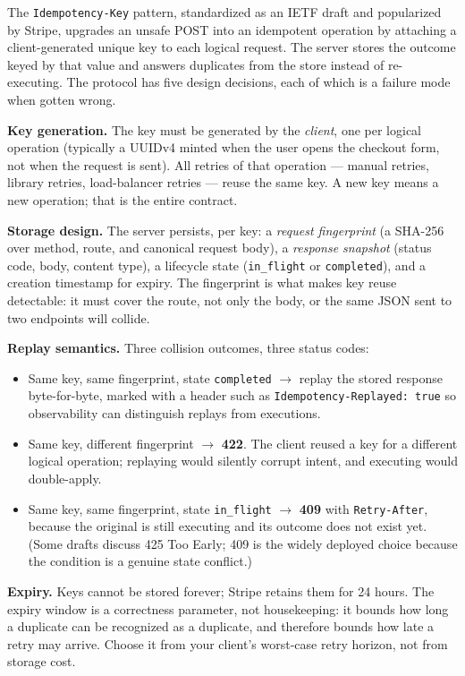 The \texttt{Idempotency-Key} pattern, standardized as an IETF draft and
popularized by Stripe, upgrades an unsafe POST into an idempotent operation
by attaching a client-generated unique key to each logical request. The
server stores the outcome keyed by that value and answers duplicates from
the store instead of re-executing. The protocol has five design decisions,
each of which is a failure mode when gotten wrong.

\textbf{Key generation.} The key must be generated by the \emph{client}, one
per logical operation (typically a UUIDv4 minted when the user opens the
checkout form, not when the request is sent). All retries of that operation
--- manual retries, library retries, load-balancer retries --- reuse the
same key. A new key means a new operation; that is the entire contract.

\textbf{Storage design.} The server persists, per key: a \emph{request
fingerprint} (a SHA-256 over method, route, and canonical request body), a
\emph{response snapshot} (status code, body, content type), a lifecycle
state (\texttt{in\_flight} or \texttt{completed}), and a creation timestamp
for expiry. The fingerprint is what makes key reuse detectable: it must
cover the route, not only the body, or the same JSON sent to two endpoints
will collide.

\textbf{Replay semantics.} Three collision outcomes, three status codes:
\begin{itemize}
  \item Same key, same fingerprint, state \texttt{completed} $\rightarrow$
        replay the stored response byte-for-byte, marked with a header such
        as \texttt{Idempotency-Replayed: true} so observability can
        distinguish replays from executions.
  \item Same key, different fingerprint $\rightarrow$ \textbf{422}. The
        client reused a key for a different logical operation; replaying
        would silently corrupt intent, and executing would double-apply.
  \item Same key, same fingerprint, state \texttt{in\_flight}
        $\rightarrow$ \textbf{409} with \texttt{Retry-After}, because the
        original is still executing and its outcome does not exist yet.
        (Some drafts discuss 425 Too Early; 409 is the widely deployed
        choice because the condition is a genuine state conflict.)
\end{itemize}

\textbf{Expiry.} Keys cannot be stored forever; Stripe retains them for 24
hours. The expiry window is a correctness parameter, not housekeeping: it
bounds how long a duplicate can be recognized as a duplicate, and therefore
bounds how late a retry may arrive. Choose it from your client's worst-case
retry horizon, not from storage cost.

